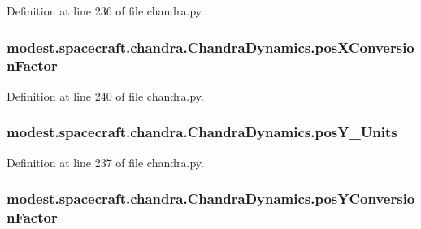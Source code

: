 Definition at line 236 of file chandra.\+py.

\subsubsection[{\texorpdfstring{pos\+X\+Conversion\+Factor}{posXConversionFactor}}]{\setlength{\rightskip}{0pt plus 5cm}modest.\+spacecraft.\+chandra.\+Chandra\+Dynamics.\+pos\+X\+Conversion\+Factor}\hypertarget{classmodest_1_1spacecraft_1_1chandra_1_1ChandraDynamics_aab9e26d67ebaef20419e0a0d4f1685b1}{}\label{classmodest_1_1spacecraft_1_1chandra_1_1ChandraDynamics_aab9e26d67ebaef20419e0a0d4f1685b1}


Definition at line 240 of file chandra.\+py.

\subsubsection[{\texorpdfstring{pos\+Y\+\_\+\+Units}{posY_Units}}]{\setlength{\rightskip}{0pt plus 5cm}modest.\+spacecraft.\+chandra.\+Chandra\+Dynamics.\+pos\+Y\+\_\+\+Units}\hypertarget{classmodest_1_1spacecraft_1_1chandra_1_1ChandraDynamics_adf49521ce1df19bdb1173295619a3294}{}\label{classmodest_1_1spacecraft_1_1chandra_1_1ChandraDynamics_adf49521ce1df19bdb1173295619a3294}


Definition at line 237 of file chandra.\+py.

\subsubsection[{\texorpdfstring{pos\+Y\+Conversion\+Factor}{posYConversionFactor}}]{\setlength{\rightskip}{0pt plus 5cm}modest.\+spacecraft.\+chandra.\+Chandra\+Dynamics.\+pos\+Y\+Conversion\+Factor}\hypertarget{classmodest_1_1spacecraft_1_1chandra_1_1ChandraDynamics_af86d4bc2f351317e101735d97deb5e14}{}\label{classmodest_1_1spacecraft_1_1chandra_1_1ChandraDynamics_af86d4bc2f351317e101735d97deb5e14}


